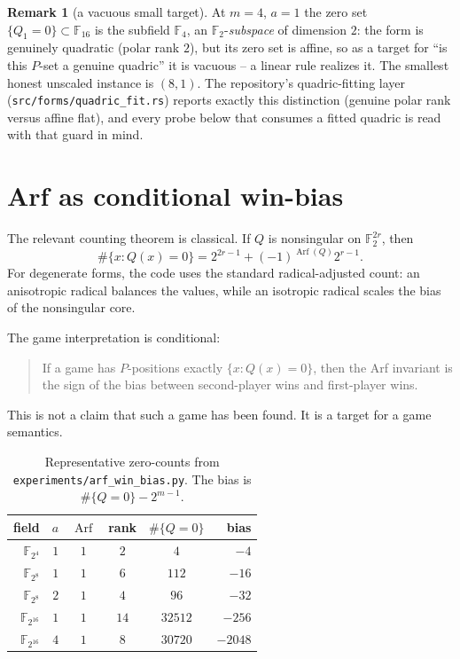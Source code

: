 \documentclass[11pt]{article}
\theoremstyle{plain}
\theoremstyle{definition}
\newtheorem{remark}{Remark}
\newcommand{\F}{\mathbb{F}}
\newcommand{\Arf}{\operatorname{Arf}}
\begin{document}
\begin{remark}[a vacuous small target]\label{rem:vacuous}
At $m=4$, $a=1$ the zero set $\{Q_1=0\}\subset\F_{16}$ is the subfield
$\F_4$, an $\F_2$-\emph{subspace} of dimension $2$: the form is genuinely
quadratic (polar rank $2$), but its zero set is affine, so as a target for
``is this $P$-set a genuine quadric'' it is vacuous -- a linear rule realizes
it. The smallest honest unscaled instance is $(8,1)$. The repository's
quadric-fitting layer (\texttt{src/forms/quadric\_fit.rs}) reports exactly
this distinction (genuine polar rank versus affine flat), and every probe
below that consumes a fitted quadric is read with that guard in mind.
\end{remark}

\section{Arf as conditional win-bias}\label{sec:bias}

The relevant counting theorem is classical. If $Q$ is nonsingular on
$\F_2^{2r}$, then
\[
  \#\{x:Q(x)=0\}
  =
  2^{2r-1}+(-1)^{\Arf(Q)}2^{r-1}.
\]
For degenerate forms, the code uses the standard radical-adjusted count: an
anisotropic radical balances the values, while an isotropic radical scales the
bias of the nonsingular core.

The game interpretation is conditional:

\begin{quote}
If a game has $P$-positions exactly $\{x:Q(x)=0\}$, then the Arf invariant is
the sign of the bias between second-player wins and first-player wins.
\end{quote}

This is not a claim that such a game has been found. It is a target for a game
semantics.

\begin{table}[h]
\centering
\begin{tabular}{rrcccr}
\toprule
field & $a$ & $\Arf$ & rank & $\#\{Q=0\}$ & bias \\
\midrule
$\F_{2^{4}}$  & $1$ & $1$ & $2$  & $4$     & $-4$ \\
$\F_{2^{8}}$  & $1$ & $1$ & $6$  & $112$   & $-16$ \\
$\F_{2^{8}}$  & $2$ & $1$ & $4$  & $96$    & $-32$ \\
$\F_{2^{16}}$ & $1$ & $1$ & $14$ & $32512$ & $-256$ \\
$\F_{2^{16}}$ & $4$ & $1$ & $8$  & $30720$ & $-2048$ \\
\bottomrule
\end{tabular}
\caption{Representative zero-counts from
\texttt{experiments/arf\_win\_bias.py}. The bias is
$\#\{Q=0\}-2^{m-1}$.}
\label{tab:bias}
\end{table}
\end{document}
